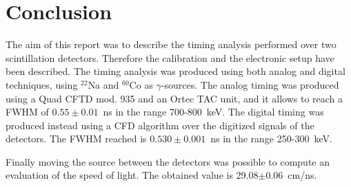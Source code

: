 \section*{Conclusion}
The aim of this report was to describe the timing analysis performed over two scintillation detectors. Therefore the calibration and the electronic setup have been described. The timing analysis was produced using both analog and digital techniques, using $^{22}$Na and $^{60}$Co as $\gamma$-sources. 
The analog timing was produced using a Quad CFTD mod. 935 and an Ortec TAC unit, and it allows to reach a FWHM of $0.55\pm0.01$~ns in the range 700-800~keV. The digital timing was produced instead using a CFD algorithm over the digitized signals of the detectors. The FWHM reached is $0.530\pm0.001$~ns in the range 250-300~keV. 

Finally moving the source between the detectors was possible to compute an evaluation of the speed of light. The obtained value is 29.08$\pm$0.06~cm/ns.